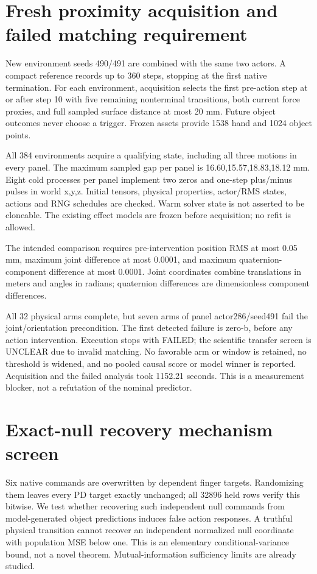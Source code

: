 \documentclass[10pt]{article}
\begin{document}
\section{Fresh proximity acquisition and failed matching requirement}
New environment seeds 490/491 are combined with the same two actors. A compact
reference records up to 360 steps, stopping at the first native termination.
For each environment, acquisition selects the first pre-action step at or after
step 10 with five remaining nonterminal transitions, both current force proxies,
and full sampled surface distance at most 20 mm. Future object outcomes never
choose a trigger. Frozen assets provide 1538 hand and 1024 object points.

All 384 environments acquire a qualifying state, including all three motions in
every panel. The maximum sampled gap per panel is 16.60,15.57,18.83,18.12 mm.
Eight cold processes per panel implement two zeros and one-step plus/minus pulses
in world x,y,z. Initial tensors, physical properties, actor/RMS states, actions and
RNG schedules are checked. Warm solver state is not asserted to be cloneable.
The existing effect models are frozen before acquisition; no refit is allowed.

The intended comparison requires pre-intervention position RMS at most 0.05 mm,
maximum joint difference at most 0.0001, and maximum quaternion-component difference
at most 0.0001. Joint coordinates combine translations in meters and angles in
radians; quaternion differences are dimensionless component differences.

\begin{table}[h]
\centering

\caption{Maximum pre-intervention mismatch over arms relative to zero-a. Limits: position 0.05 mm; joint and quaternion components 0.0001.}
\end{table}

All 32 physical arms complete, but seven arms of panel actor286/seed491 fail the
joint/orientation precondition. The first detected failure is zero-b, before any
action intervention. Execution stops with FAILED; the scientific transfer screen
is UNCLEAR due to invalid matching. No favorable arm or window is retained, no
threshold is widened, and no pooled causal score or model winner is reported.
Acquisition and the failed analysis took 1152.21 seconds. This is a measurement
blocker, not a refutation of the nominal predictor.

\section{Exact-null recovery mechanism screen}
Six native commands are overwritten by dependent finger targets. Randomizing them
leaves every PD target exactly unchanged; all 32896 held rows verify this bitwise.
We test whether recovering such independent null commands from model-generated
object predictions induces false action responses. A truthful physical transition
cannot recover an independent normalized null coordinate with population MSE below
one. This is an elementary conditional-variance bound, not a novel theorem.
Mutual-information sufficiency limits are already studied\cite{rakelly2021}.
\end{document}
